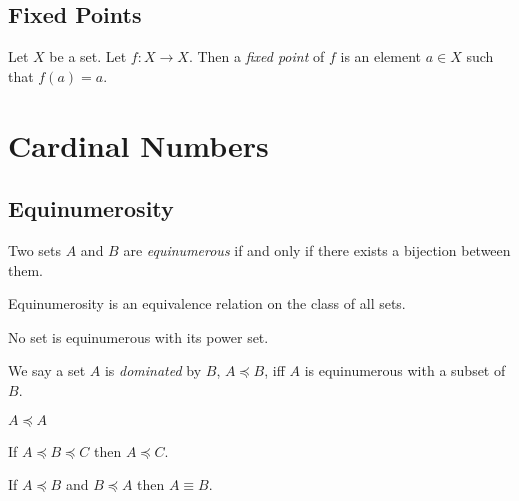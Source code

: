 \section{Fixed Points}

\begin{definition}
    Let $X$ be a set. Let $f : X \rightarrow X$. Then a \emph{fixed point}
    of $f$ is an element $a \in X$ such that $f(a) = a$.
\end{definition}

\chapter{Cardinal Numbers}

\section{Equinumerosity}

\begin{definition}[Equinumerous]
    Two sets $A$ and $B$ are \emph{equinumerous} if and only if there exists
    a bijection between them.
\end{definition}

\begin{theorem}
    Equinumerosity is an equivalence relation on the class of all sets.
\end{theorem}

\begin{theorem}[Cantor]
    No set is equinumerous with its power set.
\end{theorem}

\begin{definition}
    We say a set $A$ is \emph{dominated} by $B$, $A \preccurlyeq B$, iff
    $A$ is equinumerous with a subset of $B$.
\end{definition}

\begin{theorem}
    $A \preccurlyeq A$
\end{theorem}

\begin{theorem}
    If $A \preccurlyeq B \preccurlyeq C$ then $A \preccurlyeq C$.
\end{theorem}

\begin{theorem}
    If $A \preccurlyeq B$ and $B \preccurlyeq A$ then $A \equiv B$.
\end{theorem}

